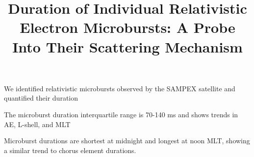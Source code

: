 \documentclass[draft]{agujournal2019}
\begin{document}
%
%



\title{Duration of Individual Relativistic Electron Microbursts: A Probe Into Their Scattering Mechanism}






\begin{keypoints}
\item We identified relativistic microbursts observed by the SAMPEX satellite and quantified their duration
\item The microburst duration interquartile range is 70-140 ms and shows trends in AE, L-shell, and MLT
\item Microburst durations are shortest at midnight and longest at noon MLT, showing a similar trend to chorus element durations.
\end{keypoints}

%
%

%
%
\end{document}
